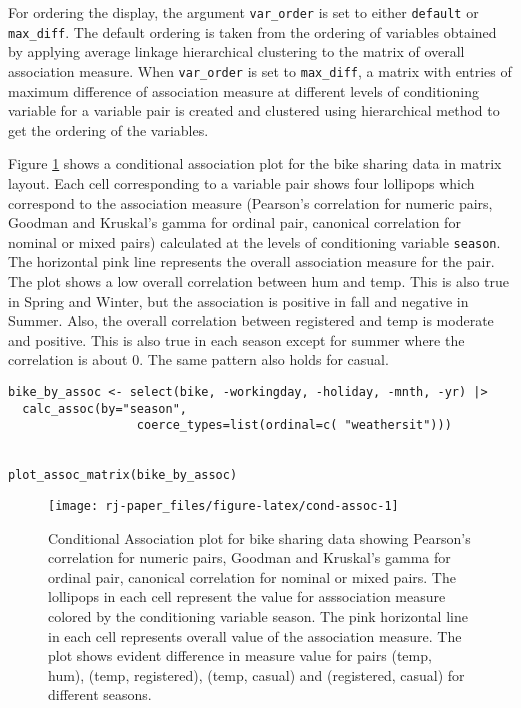 For ordering the display, the argument \texttt{var\_order} is set to either \texttt{default} or \texttt{max\_diff}. The default ordering is taken from the ordering of variables obtained by applying average linkage hierarchical clustering to the matrix of overall association measure. When \texttt{var\_order} is set to \texttt{max\_diff}, a matrix with entries of maximum difference of association measure at different levels of conditioning variable for a variable pair is created and clustered using hierarchical method to get the ordering of the variables.

Figure \ref{fig:cond-assoc} shows a conditional association plot for the bike sharing data in matrix layout. Each cell corresponding to a variable pair shows four lollipops which correspond to the association measure (Pearson's correlation for numeric pairs, Goodman and Kruskal's gamma for ordinal pair, canonical correlation for nominal or mixed pairs) calculated at the levels of conditioning variable \texttt{season}. The horizontal pink line represents the overall association measure for the pair. The plot shows a low overall correlation between hum and temp. This is also true in Spring and Winter, but the association is positive in fall and negative in Summer. Also, the overall correlation between registered and temp is moderate and positive. This is also true in each season except for summer where
the correlation is about 0. The same pattern also holds for casual.

\begin{verbatim}
bike_by_assoc <- select(bike, -workingday, -holiday, -mnth, -yr) |>
  calc_assoc(by="season", 
                  coerce_types=list(ordinal=c( "weathersit")))


plot_assoc_matrix(bike_by_assoc)
\end{verbatim}

\begin{figure}

{\centering \texttt{[image: rj-paper\_files/figure-latex/cond-assoc-1]} 

}

\caption{Conditional Association plot for bike sharing data showing Pearson's correlation for numeric pairs, Goodman and Kruskal's gamma for ordinal pair, canonical correlation for nominal or mixed pairs. The lollipops in each cell represent the value for asssociation measure colored by the conditioning variable season. The pink horizontal line in each cell represents overall value of the association measure. The plot shows evident difference in measure value for pairs (temp, hum), (temp, registered), (temp, casual) and (registered, casual) for different seasons.}\label{fig:cond-assoc}
\end{figure}


